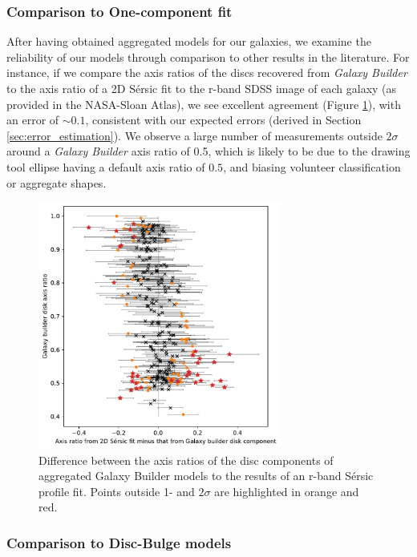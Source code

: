 \documentclass[../main.tex]{subfiles}
\begin{document}
\subsubsection{Comparison to One-component fit}

After having obtained aggregated models for our galaxies, we examine the reliability of our models through comparison to other results in the literature. For instance, if we compare the axis ratios of the discs recovered from \textit{Galaxy Builder} to the axis ratio of a 2D S\'ersic fit to the r-band SDSS image of each galaxy (as provided in the NASA-Sloan Atlas), we see excellent agreement (Figure \ref{fig:ax_ratio_comparison}), with an error of $\sim0.1$, consistent with our expected errors (derived in Section \ref{sec:error_estimation}). We observe a large number of measurements outside $2\sigma$ around a \textit{Galaxy Builder} axis ratio of 0.5, which is likely to be due to the drawing tool ellipse having a default axis ratio of $0.5$, and biasing volunteer classification or aggregate shapes.

\begin{figure}
  \includegraphics[width=8cm]{images__results/gzb-agg-nsa-comparison.pdf}
  \caption{Difference between the axis ratios of the disc components of aggregated Galaxy Builder models to the results of an r-band S\'ersic profile fit. Points outside 1- and $2\sigma$ are highlighted in orange and red.}
  \label{fig:ax_ratio_comparison}
\end{figure}


\subsubsection{Comparison to Disc-Bulge models}
\end{document}
